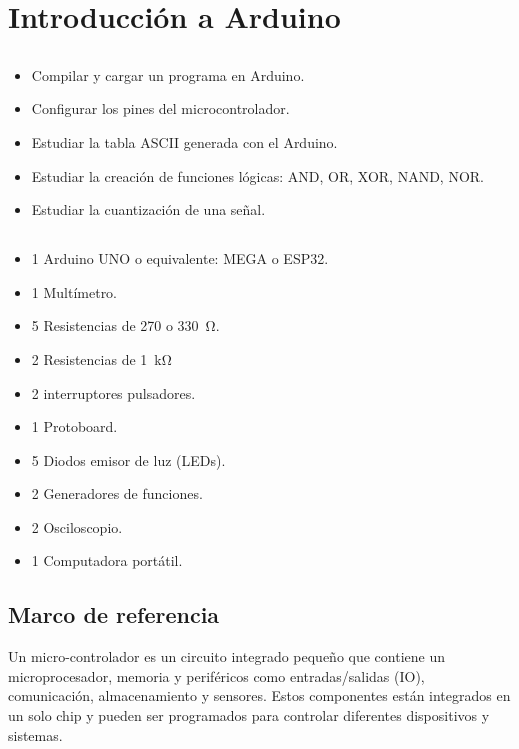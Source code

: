\chapter{Introducción a Arduino}
\section{\obj}
\capacidad
\begin{itemize}
    \item Compilar y cargar  un programa en Arduino.
    \item Configurar los pines del microcontrolador.
    \item Estudiar la tabla ASCII generada con el Arduino.
    \item Estudiar la creación de funciones lógicas: AND, OR, XOR, NAND, NOR.
    \item Estudiar la cuantización de una señal.
\end{itemize}

\section{\mat}
\begin{itemize}
\item 1 Arduino UNO o equivalente: MEGA o ESP32.
\item 1 Multímetro.
\item 5 Resistencias de 270 o \SI{330}{\ohm}.
\item 2 Resistencias de \SI{1}{\kilo\ohm}
\item 2 interruptores pulsadores.
\item 1 Protoboard.
\item 5 Diodos emisor de luz (LEDs).
\item 2 Generadores de funciones.
\item 2 Osciloscopio.
\item 1 Computadora portátil.
\end{itemize}

\section{Marco de referencia}

Un micro-controlador es un circuito integrado pequeño que contiene un microprocesador, memoria y periféricos como entradas/salidas (IO), comunicación, almacenamiento y sensores. Estos componentes están integrados en un solo chip y pueden ser programados para controlar diferentes dispositivos y sistemas.


